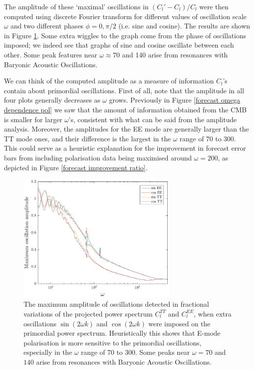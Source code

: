 The amplitude of these `maximal' oscillations in $(C_l'-C_l)/C_l$ were then computed using discrete Fourier transform for different values of oscillation scale $\omega$ and two different phases $\phi=0,\pi/2$ (i.e. sine and cosine). The results are shown in Figure \ref{insight feature plot}. Some extra wiggles to the graph come from the phase of oscillations imposed; we indeed see that graphs of sine and cosine oscillate between each other. Some peak features near $\omega\approx70$ and 140 arise from resonances with Baryonic Acoustic Oscillations.

We can think of the computed amplitude as a measure of information $C_l$'s contain about primordial oscillations. First of all, note that the amplitude in all four plots generally decreases as $\omega$ grows. Previously in Figure \ref{forecast omega dependence pol} we saw that the amount of information obtained from the CMB is smaller for larger $\omega$'s, consistent with what can be said from the amplitude analysis. Moreover, the amplitudes for the EE mode are generally larger than the TT mode ones, and their difference is the largest in the $\omega$ range of 70 to 300. This could serve as a heuristic explanation for the improvement in forecast error bars from including polarisation data being maximised around $\omega=200$, as depicted in Figure \ref{forecast improvement ratio}.

\begin{figure}[ht]
	\centering
	\includegraphics[width=0.7\textwidth]{feature_plot.pdf}
	\caption{The maximum amplitude of oscillations detected in fractional variations of the projected power spectrum $C_l^{TT}$ and $C_l^{EE}$, when extra oscillations $\sin(2\omega k)$ and $\cos(2\omega k)$ were imposed on the primordial power spectrum. Heuristically this shows that E-mode polarisation is more sensitive to the primordial oscillations, especially in the $\omega$ range of 70 to 300. Some peaks near $\omega=70$ and $140$ arise from resonances with Baryonic Acoustic Oscillations. }
	\label{insight feature plot}
\end{figure}


